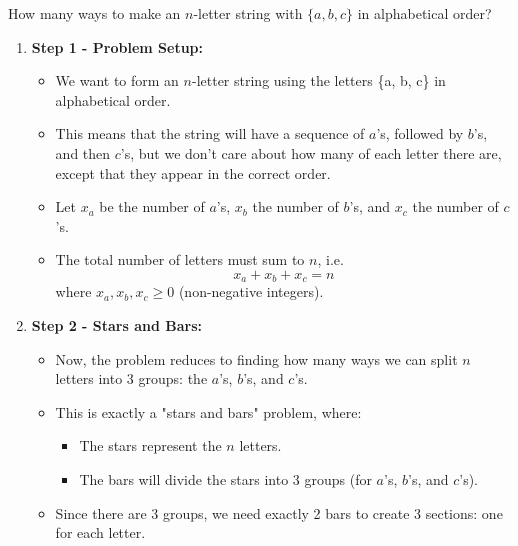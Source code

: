     \begin{example}
        How many ways to make an $n$-letter string with $\{a, b, c\}$ in alphabetical order?

        \begin{enumerate}
            \item \textbf{Step 1 - Problem Setup:}
            \begin{itemize}
                \item We want to form an $n$-letter string using the letters \{a, b, c\} in alphabetical order.
                \item This means that the string will have a sequence of $a$'s, followed by $b$'s, and then $c$'s, but we don’t care about how many of each letter there are, except that they appear in the correct order.
                \item Let $x_a$ be the number of $a$'s, $x_b$ the number of $b$'s, and $x_c$ the number of $c$'s.
                \item The total number of letters must sum to $n$, i.e.
                \[
                x_a + x_b + x_c = n
                \]
                where $x_a, x_b, x_c \geq 0$ (non-negative integers).
            \end{itemize}
            
            \item \textbf{Step 2 - Stars and Bars:}
            \begin{itemize}
                \item Now, the problem reduces to finding how many ways we can split $n$ letters into 3 groups: the $a$'s, $b$'s, and $c$'s.
                \item This is exactly a "stars and bars" problem, where:
                \begin{itemize}
                    \item The stars represent the $n$ letters.
                    \item The bars will divide the stars into 3 groups (for $a$'s, $b$'s, and $c$'s).
                \end{itemize}
                \item Since there are 3 groups, we need exactly 2 bars to create 3 sections: one for each letter.
            \end{itemize}
            

\end{enumerate}
\end{example}
